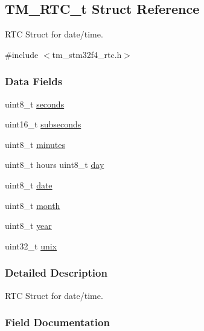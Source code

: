 \hypertarget{struct_t_m___r_t_c__t}{}\subsection{T\+M\+\_\+\+R\+T\+C\+\_\+t Struct Reference}
\label{struct_t_m___r_t_c__t}


R\+T\+C Struct for date/time.  




{\ttfamily \#include $<$tm\+\_\+stm32f4\+\_\+rtc.\+h$>$}

\subsubsection*{Data Fields}
\begin{DoxyCompactItemize}
\item 
uint8\+\_\+t \hyperlink{struct_t_m___r_t_c__t_a46729a903be1a03cdb248fb48d84d4f5}{seconds}
\item 
uint16\+\_\+t \hyperlink{struct_t_m___r_t_c__t_a077301f5916fde6c214879726fec4bc3}{subseconds}
\item 
uint8\+\_\+t \hyperlink{struct_t_m___r_t_c__t_a7acca8be0094a19be6e308ac05924c4f}{minutes}
\item 
uint8\+\_\+t hours uint8\+\_\+t \hyperlink{struct_t_m___r_t_c__t_a10f9f555e8de6ed6d41f7c7621cc877d}{day}
\item 
uint8\+\_\+t \hyperlink{struct_t_m___r_t_c__t_a30ca8635d0267ef5190a408d7a134f7e}{date}
\item 
uint8\+\_\+t \hyperlink{struct_t_m___r_t_c__t_a3e00faf7fbf9805e9ec4d2edd6339050}{month}
\item 
uint8\+\_\+t \hyperlink{struct_t_m___r_t_c__t_a7af2065789bc84419b8d5fe109be83b5}{year}
\item 
uint32\+\_\+t \hyperlink{struct_t_m___r_t_c__t_a04ff4d1b92a0a093f5fbe7d9c47c6e8c}{unix}
\end{DoxyCompactItemize}


\subsubsection{Detailed Description}
R\+T\+C Struct for date/time. 

\subsubsection{Field Documentation}
\hypertarget{struct_t_m___r_t_c__t_a30ca8635d0267ef5190a408d7a134f7e}{}
